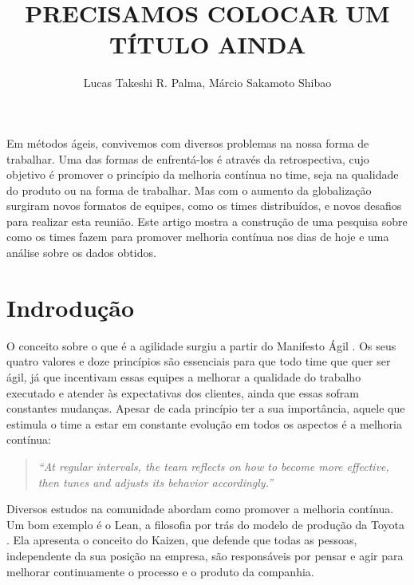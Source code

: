 \documentclass[12pt]{article}
\title{PRECISAMOS COLOCAR UM TÍTULO AINDA}
\author{Lucas Takeshi R. Palma\inst{1}, Márcio Sakamoto Shibao\inst{1}}
\begin{document}
 

\maketitle

\begin{abstract}
  
\end{abstract}
     
\begin{resumo} 
Em métodos ágeis, convivemos com diversos problemas na nossa forma de trabalhar. Uma das formas de enfrentá-los é através da retrospectiva, cujo objetivo é promover o princípio da melhoria contínua no time, seja na qualidade do produto ou na forma de trabalhar. Mas com o aumento da globalização surgiram novos formatos de equipes, como os times distribuídos, e novos desafios para realizar esta reunião. Este artigo mostra a construção de uma pesquisa sobre como os times fazem para promover melhoria contínua nos dias de hoje e uma análise sobre os dados obtidos. 
\end{resumo}

\section{Indrodução}

O conceito sobre o que é a agilidade surgiu a partir do Manifesto Ágil \cite{manifesto:01}. Os seus quatro valores e doze princípios são essenciais para que todo time que quer ser ágil, já que incentivam essas equipes a melhorar a qualidade do trabalho executado e atender às expectativas dos clientes, ainda que essas sofram constantes mudanças. Apesar de cada princípio ter a sua importância, aquele que estimula o time a estar em constante evolução em todos os aspectos é a melhoria contínua:

\begin{quote}
  \textit{``At regular intervals, the team reflects on how to become more effective, then tunes and adjusts its behavior accordingly.''}\cite{manifesto:01}
\end{quote}

Diversos estudos na comunidade abordam como promover a melhoria contínua. Um bom exemplo é o Lean, a filosofia por trás do modelo de produção da Toyota \cite{ohno:88}. Ela apresenta o conceito do Kaizen, que defende que todas as pessoas, independente da sua posição na empresa, são responsáveis por pensar e agir para melhorar continuamente o processo e o produto da companhia.
\end{document}

